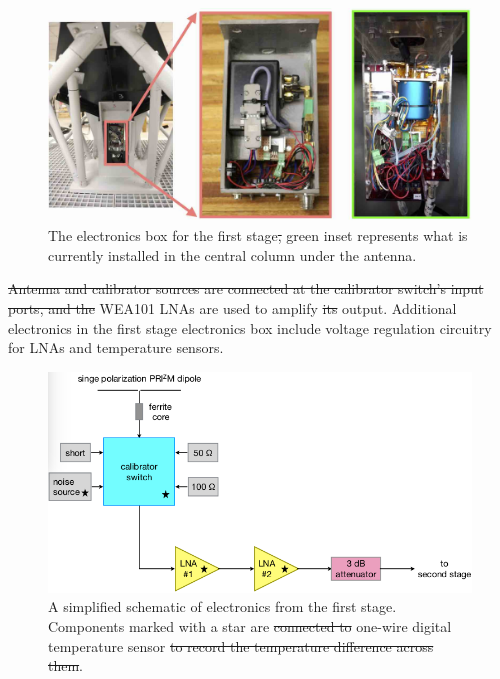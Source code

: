 \begin{figure}
	\centering
	\includegraphics[width=0.7\linewidth]{Figures/column}
	\caption{The electronics box for the first stage\st{,}   green inset represents what is currently installed in the central column under the antenna.}
	\label{Fig:column}
\end{figure}

\st{Antenna and calibrator sources are connected at the calibrator switch's input ports, and the}  WEA101 LNAs are used to amplify \st{its}  output. Additional electronics in the first stage electronics box include voltage regulation circuitry for LNAs and temperature sensors.  

\begin{figure}
	\centering
	\includegraphics[width=\linewidth]{Figures/prizm_fee_block}
	\caption{A simplified schematic of electronics from the first stage. Components marked with a star are \st{connected to}  one-wire digital temperature sensor \st{to record the temperature difference across them}.  }
	\label{Fig:prizm_fee_block}
\end{figure}  

